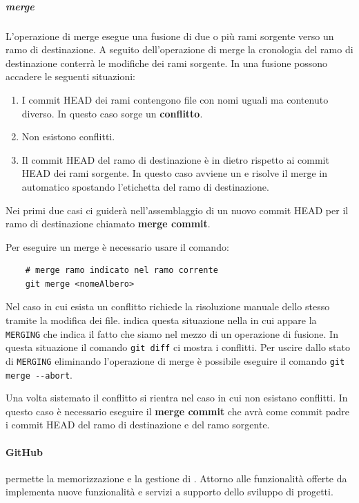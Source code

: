 \subparagraph{merge}
\label{subpar:merge}
L'operazione di merge esegue una fusione di due o più rami sorgente verso un ramo di destinazione.
A seguito dell'operazione di merge la cronologia del ramo di destinazione conterrà le modifiche dei rami sorgente.
In una fusione possono accadere le seguenti situazioni:
\begin{enumerate}
    \item I commit HEAD dei rami contengono file con nomi uguali ma contenuto diverso.
    In questo caso sorge un \textbf{conflitto}.

    \item Non esistono conflitti.

    \item Il commit HEAD del ramo di destinazione è in dietro rispetto ai commit HEAD dei rami sorgente.
    In questo caso avviene un \textbf{} e  risolve il merge in automatico spostando l'etichetta del ramo di destinazione.
\end{enumerate}
Nei primi due casi  ci guiderà nell'assemblaggio di un nuovo commit HEAD per il ramo di destinazione chiamato \textbf{merge commit}.

Per eseguire un merge è necessario usare il comando:
\begin{lstlisting}
    # merge ramo indicato nel ramo corrente
    git merge <nomeAlbero>
\end{lstlisting}

Nel caso in cui esista un conflitto  richiede la risoluzione manuale dello stesso tramite la modifica dei file.
 indica questa situazione nella  in cui appare la  \texttt{MERGING} che indica il fatto che siamo nel mezzo di un operazione di fusione.
In questa situazione il comando \lstinline|git diff| ci mostra i conflitti.
Per uscire dallo stato di \texttt{MERGING} eliminando l'operazione di merge è possibile eseguire il comando \lstinline|git merge --abort|.

Una volta sistemato il conflitto si rientra nel caso in cui non esistano conflitti.
In questo caso è necessario eseguire il \textbf{merge commit} che avrà come commit padre i  commit HEAD del ramo di destinazione e del 
ramo sorgente.

\paragraph{GitHub}
 permette la memorizzazione e la gestione di  .
Attorno alle funzionalità offerte da  implementa nuove funzionalità e servizi a supporto dello sviluppo di progetti.


